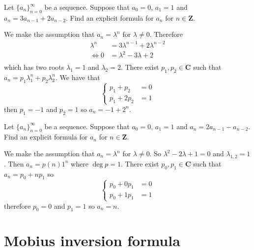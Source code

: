 \begin{example}
Let $\{ a_{n} \}_{n=0}^{\infty}$ be a sequence. Suppose that $a_{0}=0$, $a_{1}=1$ and $a_{n}=3a_{n-1}+2a_{n-2}$. Find an explicit formula for $a_{n}$ for $n\in \mathbf{Z}$.

We make the assumption that $a_{n}=\lambda^{n}$ for $\lambda\neq 0$. Therefore 
\begin{align*}
\lambda^{n}  & =3\lambda^{n-1}+2\lambda^{n-2} \\
\Leftrightarrow0  & =\lambda^{2}-3\lambda +2 \\
\end{align*}
which has two roots $\lambda_{1}=1$ and $\lambda_{2}=2$. There exist $p_{1},p_{2}\in \mathbf{C}$ such that $a_{n}=p_{1}\lambda_{1}^{n}+p_{2}\lambda_{2}^{n}$. We have that
$$
\begin{cases}
p_{1}+p_{2} & =0 \\
p_{1}+2p_{2} & =1
\end{cases}
$$
then $p_{1}=-1$ and $p_{2}=1$ so $a_{n}=-1+2^{n}$.
\end{example}
\begin{example}
Let $\{ a_{n} \}_{n=0}^{\infty}$ be a sequence. Suppose that $a_{0}=0$, $a_{1}=1$ and $a_{n}=2a_{n-1}-a_{n-2}$. Find an explicit formula for $a_{n}$ for $n\in \mathbf{Z}$.

We make the assumption that $a_{n}=\lambda^{n}$ for $\lambda\neq 0$. So $\lambda^{2}-2\lambda +1=0$ and $\lambda_{1,2}=1$. Then $a_{n}=p(n)1^{n}$ where $\deg p=1$. There exist $p_{0},p_{1}\in \mathbf{C}$ such that $a_{n}=p_{0}+np_{1}$ so 
$$
\begin{cases}
p_{0}+0p_{1} &  =0 \\
p_{0} +1p_{1} & =1
\end{cases}
$$
therefore $p_{0}=0$ and $p_{1}=1$ so $a_{n}=n$.
\end{example}

\section{Mobius inversion formula}

